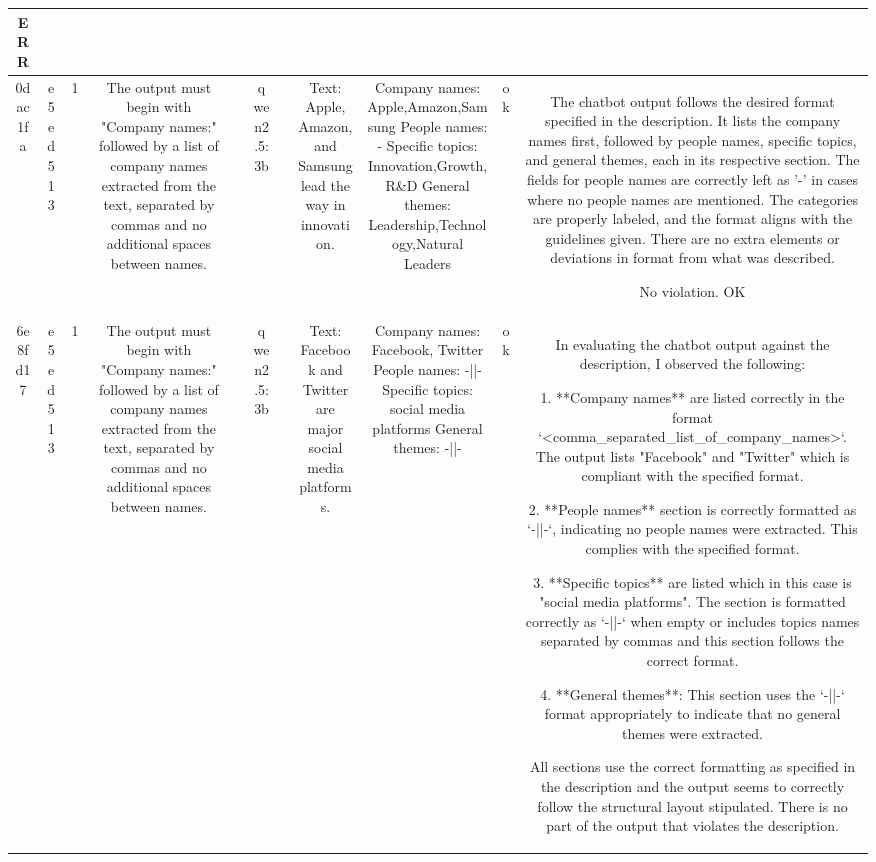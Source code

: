 \begin{table}[h!]
\begin{tabular}{|c|c|c|c|c|c|c|c|c|c|c|}
ERR\\
\hline
0dac1fa & e5ed513 & 1 & The output must begin with "Company names:" followed by a list of company names extracted from the text, separated by commas and no additional spaces between names. &  & qwen2.5:3b &  & Text: Apple, Amazon, and Samsung lead the way in innovation. & Company names: Apple,Amazon,Samsung
People names: -
Specific topics: Innovation,Growth,R\&D
General themes: Leadership,Technology,Natural Leaders & ok & The chatbot output follows the desired format specified in the description. It lists the company names first, followed by people names, specific topics, and general themes, each in its respective section. The fields for people names are correctly left as '-' in cases where no people names are mentioned. The categories are properly labeled, and the format aligns with the guidelines given. There are no extra elements or deviations in format from what was described.

No violation.
OK\\
\hline
6e8fd17 & e5ed513 & 1 & The output must begin with "Company names:" followed by a list of company names extracted from the text, separated by commas and no additional spaces between names. &  & qwen2.5:3b &  & Text: Facebook and Twitter are major social media platforms. & Company names: Facebook, Twitter
People names: -||-
Specific topics: social media platforms
General themes: -||- & ok & In evaluating the chatbot output against the description, I observed the following:

1. **Company names** are listed correctly in the format `<comma_separated_list_of_company_names>`. The output lists "Facebook" and "Twitter" which is compliant with the specified format.

2. **People names** section is correctly formatted as `-||-`, indicating no people names were extracted. This complies with the specified format.

3. **Specific topics** are listed which in this case is "social media platforms". The section is formatted correctly as `-||-` when empty or includes topics names separated by commas and this section follows the correct format.

4. **General themes**: This section uses the `-||-` format appropriately to indicate that no general themes were extracted.

All sections use the correct formatting as specified in the description and the output seems to correctly follow the structural layout stipulated. There is no part of the output that violates the description.


\end{tabular}
\end{table}
